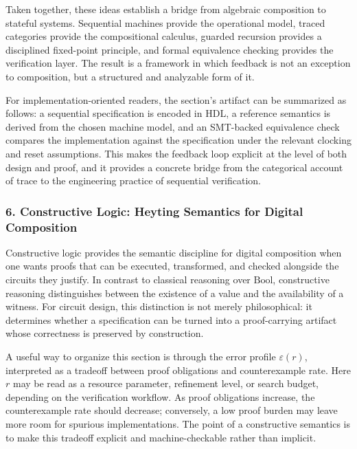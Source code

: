 \documentclass[11pt]{article}
\begin{document}
Taken together, these ideas establish a bridge from algebraic composition to stateful systems. Sequential machines provide the operational model, traced categories provide the compositional calculus, guarded recursion provides a disciplined fixed-point principle, and formal equivalence checking provides the verification layer. The result is a framework in which feedback is not an exception to composition, but a structured and analyzable form of it.

For implementation-oriented readers, the section's artifact can be summarized as follows: a sequential specification is encoded in HDL, a reference semantics is derived from the chosen machine model, and an SMT-backed equivalence check compares the implementation against the specification under the relevant clocking and reset assumptions. This makes the feedback loop explicit at the level of both design and proof, and it provides a concrete bridge from the categorical account of trace to the engineering practice of sequential verification.



\subsubsection{6. Constructive Logic: Heyting Semantics for Digital Composition}


Constructive logic provides the semantic discipline for digital composition when one wants proofs that can be executed, transformed, and checked alongside the circuits they justify. In contrast to classical reasoning over \(\mathrm{Bool}\), constructive reasoning distinguishes between the existence of a value and the availability of a witness. For circuit design, this distinction is not merely philosophical: it determines whether a specification can be turned into a proof-carrying artifact whose correctness is preserved by construction.

A useful way to organize this section is through the error profile \(\varepsilon(r)\), interpreted as a tradeoff between proof obligations and counterexample rate. Here \(r\) may be read as a resource parameter, refinement level, or search budget, depending on the verification workflow. As proof obligations increase, the counterexample rate should decrease; conversely, a low proof burden may leave more room for spurious implementations. The point of a constructive semantics is to make this tradeoff explicit and machine-checkable rather than implicit.
\end{document}
